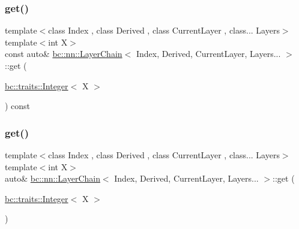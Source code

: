 \subsubsection{\texorpdfstring{get()}{get()}\hspace{0.1cm}{\footnotesize\ttfamily [3/4]}}
{\footnotesize\ttfamily template$<$class Index , class Derived , class Current\+Layer , class... Layers$>$ \\
template$<$int X$>$ \\
const auto\& \hyperlink{structbc_1_1nn_1_1LayerChain}{bc\+::nn\+::\+Layer\+Chain}$<$ Index, Derived, Current\+Layer, Layers... $>$\+::get (\begin{DoxyParamCaption}\item[{\hyperlink{structbc_1_1traits_1_1Integer}{bc\+::traits\+::\+Integer}$<$ X $>$}]{ }\end{DoxyParamCaption}) const\hspace{0.3cm}{\ttfamily [inline]}}

\mbox{\label{structbc_1_1nn_1_1LayerChain_3_01Index_00_01Derived_00_01CurrentLayer_00_01Layers_8_8_8_01_4_aa8654e4508823c73ae2cd6fb38049044}} 
\subsubsection{\texorpdfstring{get()}{get()}\hspace{0.1cm}{\footnotesize\ttfamily [4/4]}}
{\footnotesize\ttfamily template$<$class Index , class Derived , class Current\+Layer , class... Layers$>$ \\
template$<$int X$>$ \\
auto\& \hyperlink{structbc_1_1nn_1_1LayerChain}{bc\+::nn\+::\+Layer\+Chain}$<$ Index, Derived, Current\+Layer, Layers... $>$\+::get (\begin{DoxyParamCaption}\item[{\hyperlink{structbc_1_1traits_1_1Integer}{bc\+::traits\+::\+Integer}$<$ X $>$}]{ }\end{DoxyParamCaption})\hspace{0.3cm}{\ttfamily [inline]}}

